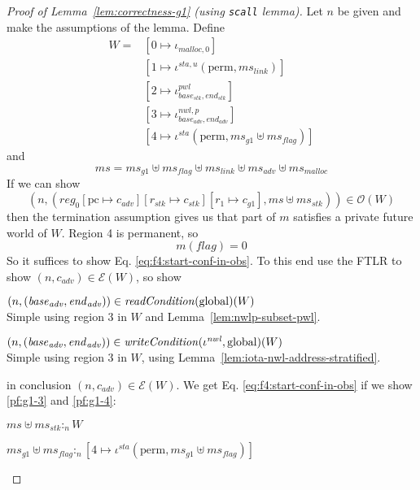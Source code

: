 \documentclass[a4paper]{article}
\newcommand{\update}[2]{[#1 \mapsto #2]}
\newcommand{\var}[1]{\mathit{#1}}
\newcommand{\hs}{\var{ms}}
\newcommand{\ms}{\hs}
\newcommand{\pcreg}{\mathrm{pc}}
\newcommand{\start}{\var{base}}
\newcommand{\addrend}{\var{end}}
\newcommand{\reg}{\var{reg}}
\newcommand{\heap}{\var{mem}}
\newcommand{\adv}{\var{adv}}
\newcommand{\link}{\var{link}}
\newcommand{\stk}{\var{stk}}
\newcommand{\flag}{\var{flag}}
\newcommand{\nwl}{\var{nwl}}
\newcommand{\pwl}{\var{pwl}}
\newcommand{\sta}{\var{sta}}
\newcommand{\plainfun}[2]{
  \ifthenelse{\equal{#2}{}}
  {\mathit{#1}}
  {\mathit{#1}(#2)}
}
\newcommand{\readCond}[1]{\plainfun{readCondition}{#1}}
\newcommand{\writeCond}[1]{\plainfun{writeCondition}{#1}}
\newcommand{\heapSat}[3][\heap]{#1 :_{#2} #3}
\newcommand{\memSat}[3][n]{\heapSat[#2]{#1}{#3}}
\newcommand{\codelabel}[1]{\mathit{#1}}
\newcommand{\malloc}{\codelabel{malloc}}
\newcommand{\asmType}{\plaindom{AsmType}}
\newcommand{\plaindom}[1]{\mathrm{#1}}
\newcommand{\intr}[2]{\mathcal{#1}}
\newcommand{\exprintr}[1]{\intr{E}{#1}}
\newcommand{\stder}{\exprintr{\asmType}}
\newcommand{\observations}{\mathcal{O}}
\newcommand{\npair}[2][n]{\left(#1,#2 \right)}
\newcommand{\plainperm}[1]{\mathrm{#1}}
\newcommand{\glob}{\plainperm{global}}
\newcommand{\plainview}[1]{\mathrm{#1}}
\newcommand{\perma}{\plainview{perm}}
\begin{document}
\begin{proof}[Proof of Lemma~\ref{lem:correctness-g1} (using \texttt{scall} lemma)]
  Let $n$ be given and make the assumptions of the lemma. Define
  \begin{align*}
    W = & [0 \mapsto \iota_{\malloc,0}]\\
        & [1 \mapsto \iota^{\sta,u} (\perma,\ms_\link)]\\
        & [2 \mapsto \iota^\pwl_{\start_\stk, \addrend_\stk}]\\
        & [3 \mapsto \iota^{\nwl,p}_{\start_\adv,\addrend_\adv}]\\
        & [4 \mapsto \iota^\sta (\perma,\ms_{g1} \uplus \ms_\flag)]
  \end{align*}
  and
  \[
    \ms = \ms_{g1} \uplus 
          \ms_\flag \uplus                
          \ms_\link \uplus 
          \ms_\adv \uplus 
          \ms_\malloc 
  \]
  If we can show
  \begin{equation}
    \label{eq:f4:start-conf-in-obs}
        \npair{(\reg_0\update{\pcreg}{c_\adv}\update{r_\stk}{c_\stk}\update{r_1}{c_{g1}},\ms \uplus \ms_\stk)} \in \observations(W)
  \end{equation}
  then the termination assumption gives us that part of $m$ satisfies a private future world of $W$. Region 4 is permanent, so
  \[
    m(\flag) = 0
  \]
  So it suffices to show Eq. \ref{eq:f4:start-conf-in-obs}. 
  To this end use the FTLR to show $\npair{c_\adv} \in \stder(W)$, so show
  \begin{enumproof}
    \item $\npair{(\start_\adv,\addrend_\adv)} \in \readCond{}(\glob)(W)$\\
      Simple using region $3$ in $W$ and Lemma~\ref{lem:nwlp-subset-pwl}.
    \item $\npair{(\start_\adv,\addrend_\adv)} \in \writeCond{}(\iota^\nwl,\glob)(W)$\\
      Simple using region $3$ in $W$, using
      Lemma~\ref{lem:iota-nwl-address-stratified}.
  \end{enumproof}
  in conclusion $\npair{c_\adv} \in \stder(W)$. We get Eq. \ref{eq:f4:start-conf-in-obs} if we show \ref{pf:g1-3} and \ref{pf:g1-4}:
  \begin{enumproof}[resume]
    \item $\memSat{\ms \uplus \ms_\stk}{W}$ \label{pf:g1-3}\\
      \begin{enumproof}
        \item $\memSat{\ms_{g1} \uplus \ms_\flag}{[4 \mapsto \iota^\sta (\perma,\ms_{g1} \uplus \ms_\flag)]}$ \label{pf:g1-3-1}\\

\end{enumproof}
\end{enumproof}
\end{proof}
\end{document}
